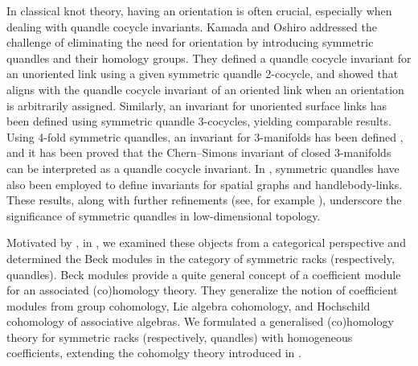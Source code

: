 \documentclass[11pt,reqno]{amsart}
\theoremstyle{definition}
\numberwithin{equation}{subsection}
\begin{document}
In classical knot theory, having an orientation is often crucial, especially when dealing with quandle cocycle invariants. Kamada and Oshiro  \cite{MR2371714, MR2657689} addressed the challenge of eliminating the need for orientation by introducing symmetric quandles and their homology groups. They defined a quandle cocycle invariant for an unoriented link using a given symmetric quandle 2-cocycle, and showed that aligns with the quandle cocycle invariant of an oriented link when an orientation is arbitrarily assigned. Similarly, an invariant for unoriented surface links has been defined using symmetric quandle 3-cocycles, yielding comparable results. Using 4-fold symmetric quandles, an invariant for 3-manifolds has been defined \cite{MR2945646, MR2821435}, and it has been proved that the Chern--Simons invariant of closed 3-manifolds can be interpreted as a quandle cocycle invariant. In \cite{MR2890467}, symmetric quandles have also been employed to define invariants for spatial graphs and handlebody-links. These results, along with further refinements (see, for example  \cite{MR4476068, MR2629767, MR4594919}), underscore the significance of symmetric quandles in low-dimensional topology.
\par

Motivated by \cite{MR1994219, MR2155522}, in \cite{KSS2024}, we examined these objects from a categorical perspective and determined the Beck modules  \cite{MR2616383} in the category of symmetric racks (respectively, quandles). Beck modules provide a quite general concept of a coefficient module for an associated (co)homology theory. They generalize the notion of coefficient modules from group cohomology, Lie algebra cohomology, and Hochschild cohomology of associative algebras. We formulated a generalised (co)homology theory for symmetric racks (respectively, quandles) with homogeneous coefficients, extending the cohomolgy theory introduced in \cite{MR2657689}.
\par
\end{document}
